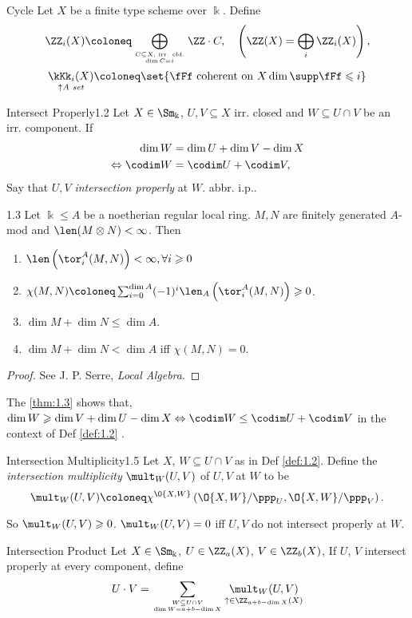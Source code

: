 \begin{definition}{Cycle}{}
	Let $X$ be a finite type scheme over $\Bbbk$. Define
	$$
	\ZZ_i(X)\coloneq\bigoplus_{C \subseteq X,\text { irr. cld.}\atop\dim C=i}\ZZ \cdot C, \quad\left(\ZZ(X)=\bigoplus_i \ZZ_i(X)\right),
	$$
	$$
	\underset{\uparrow\emph{\text{A set}}}{\kKk_i(X)}\coloneq\set{\fFf \text { coherent on } X \dim\supp \fFf \leqslant i}
	$$
\end{definition}

\begin{definition}{Intersect Properly}{1.2}
	Let $X \in \Sm_{\Bbbk}$, $U, V \subseteq X$ irr. closed and $W \subseteq U \cap V$ be an irr. component. If
	$$
	\begin{aligned}
		\dim W                   & =\dim U+\dim V-\dim X \\
		\Leftrightarrow \codim W & =\codim U+\codim V,
	\end{aligned}
	$$
	Say that $U, V$ \emph{intersection properly} at $W$. abbr. i.p..
\end{definition}

\begin{theorem}{}{1.3}
	Let $\Bbbk \leq A$ be a noetherian regular local ring. $M, N$ are finitely generated $A$-mod and $\len(M \otimes N)<\infty$. Then
	\begin{enumerate}
		\item
				$\len\left(\tor_i^A(M, N)\right)<\infty, \forall i \geqslant 0$
		\item
				$\chi(M, N)\coloneq\sum_{i=0}^{\dim A}(-1)^i\len_A\left(\tor_i^A(M, N)\right) \geqslant 0$.
		\item
				$\dim M+\dim N \leq \dim A$.
		\item
				$\dim M+\dim N<\dim A$ iff $\chi(M, N)=0$.
	\end{enumerate}
\end{theorem}
\begin{proof}
	See J. P. Serre, \textit{Local Algebra}.
\end{proof}

\begin{proposition}{}{}
	The \ref{thm:1.3} shows that, $\dim W \geqslant \dim V+\dim U-\dim X \Leftrightarrow \codim W \leq \codim U+\codim V$ in the context of Def \ref{def:1.2} .
\end{proposition}

\begin{definition}{Intersection Multiplicity}{1.5}
	Let $X$, $W \subseteq U\cap V$ as in Def \ref{def:1.2}. Define the \emph{intersection multiplicity} $\mult_W(U, V)$ of $U, V$ at $W$ to be
	\[
			\mult_W(U, V)\coloneq \chi^{\O{X,W}}\left(\O{X, W} / \ppp_U, \O{X, W} / \ppp_V\right).
	\]

\end{definition}
So $\mult_W(U, V) \geqslant 0$. $\mult_W(U, V)=0$ iff $U, V$ do not intersect properly at $W$.
\begin{definition}{Intersection Product}{}
	Let $X\in \Sm_{\Bbbk}$, $U\in \ZZ_a(X)$, $V\in \ZZ_b(X)$, If $U$, $V$ intersect properly at every component, define
	\[
			U\cdot V
			= \sum_{W\subseteq U\cap V\atop \dim W=a+b-\dim X}
			\underset{\uparrow\in \ZZ_{a+b-\dim X}(X)}{\mult_{W}(U,V)}
	\]
\end{definition}

